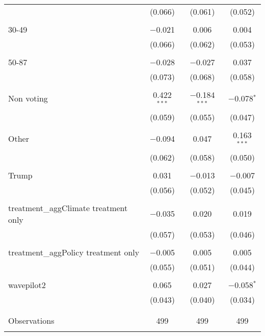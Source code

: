\begin{tabular}{@{\extracolsep{5pt}}lccc}
  & (0.066) & (0.061) & (0.052) \\ 
  & & & \\ 
 30-49 & $-$0.021 & 0.006 & 0.004 \\ 
  & (0.066) & (0.062) & (0.053) \\ 
  & & & \\ 
 50-87 & $-$0.028 & $-$0.027 & 0.037 \\ 
  & (0.073) & (0.068) & (0.058) \\ 
  & & & \\ 
 Non voting & 0.422$^{***}$ & $-$0.184$^{***}$ & $-$0.078$^{*}$ \\ 
  & (0.059) & (0.055) & (0.047) \\ 
  & & & \\ 
 Other & $-$0.094 & 0.047 & 0.163$^{***}$ \\ 
  & (0.062) & (0.058) & (0.050) \\ 
  & & & \\ 
 Trump & 0.031 & $-$0.013 & $-$0.007 \\ 
  & (0.056) & (0.052) & (0.045) \\ 
  & & & \\ 
 treatment\_aggClimate treatment only & $-$0.035 & 0.020 & 0.019 \\ 
  & (0.057) & (0.053) & (0.046) \\ 
  & & & \\ 
 treatment\_aggPolicy treatment only & $-$0.005 & 0.005 & 0.005 \\ 
  & (0.055) & (0.051) & (0.044) \\ 
  & & & \\ 
 wavepilot2 & 0.065 & 0.027 & $-$0.058$^{*}$ \\ 
  & (0.043) & (0.040) & (0.034) \\ 
  & & & \\ 
\hline \\[-1.8ex] 

Observations & 499 & 499 & 499 \\ 
\hline 
\hline \\[-1.8ex] 
\end{tabular} 
